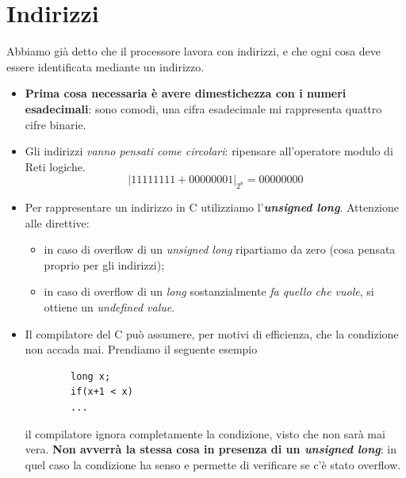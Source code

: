 \section{Indirizzi}
Abbiamo già detto che il processore lavora con indirizzi, e che ogni cosa deve essere identificata mediante un indirizzo.
\begin{itemize}
	\item \textbf{Prima cosa necessaria è avere dimestichezza con i numeri esadecimali}: sono comodi, una cifra esadecimale mi rappresenta quattro cifre binarie.
	\item Gli indirizzi \emph{vanno pensati come circolari}: ripensare all'operatore modulo di Reti logiche.
	\[|11111111+00000001|_{2^8}=00000000\]
	\item Per rappresentare un indirizzo in C utilizziamo l'\emph{\textbf{unsigned long}}. Attenzione alle direttive:
	\begin{itemize}
		\item in caso di overflow di un \emph{unsigned long} ripartiamo da zero (cosa pensata proprio per gli indirizzi);
		\item in caso di overflow di un \emph{long} sostanzialmente \emph{fa quello che vuole}, si ottiene un \emph{undefined value}.
	\end{itemize}
	\item Il compilatore del C può assumere, per motivi di efficienza, che la condizione non accada mai. Prendiamo il seguente esempio
	\begin{verbatim}
		long x;
		if(x+1 < x)
		...
	\end{verbatim}
	il compilatore ignora completamente la condizione, visto che non sarà mai vera. \textbf{Non avverrà la stessa cosa in presenza di un \emph{unsigned long}}: in quel caso la condizione ha senso e permette di verificare se c'è stato overflow.
\end{itemize}

